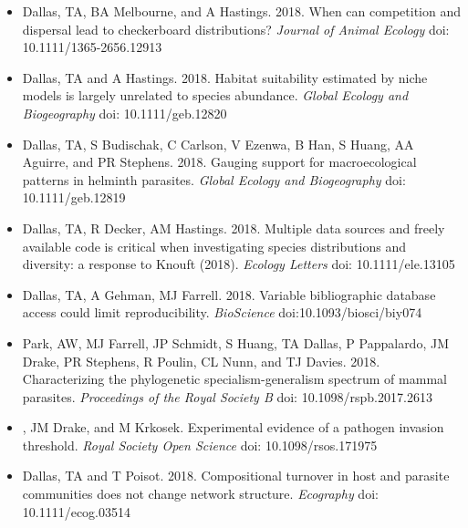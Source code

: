 \documentclass[]{CV}
\begin{document}
{}
\begin{itemize}

\item {\mefont Dallas, TA}, BA Melbourne, and A Hastings. 2018. When can competition and dispersal lead to checkerboard distributions? \textit{Journal of Animal Ecology} doi: 10.1111/1365-2656.12913

\item {\mefont Dallas, TA} and A Hastings. 2018. Habitat suitability estimated by niche models is largely unrelated to species abundance. \textit{Global Ecology and Biogeography} doi: 10.1111/geb.12820

\item {\mefont Dallas, TA}, S Budischak, C Carlson, V Ezenwa, B Han, S Huang, AA Aguirre, and PR Stephens. 2018. Gauging support for macroecological patterns in helminth parasites. \textit{Global Ecology and Biogeography} doi: 10.1111/geb.12819

\item {\mefont Dallas, TA}, R Decker, AM Hastings. 2018. Multiple data sources and freely available code is critical when investigating species distributions and diversity: a response to Knouft (2018). \textit{Ecology Letters} doi: 10.1111/ele.13105

\item {\mefont Dallas, TA}, A Gehman, MJ Farrell. 2018. Variable bibliographic database access could limit reproducibility. \textit{BioScience} doi:10.1093/biosci/biy074

\item Park, AW, MJ Farrell, JP Schmidt, S Huang, {\mefont TA Dallas}, P Pappalardo, JM Drake, PR Stephens, R Poulin, CL Nunn, and TJ Davies. 2018. Characterizing the phylogenetic specialism-generalism spectrum of mammal parasites. \textit{Proceedings of the Royal Society B} doi: 10.1098/rspb.2017.2613

\item {}, JM Drake, and M Krkosek. Experimental evidence of a pathogen invasion threshold. \textit{Royal Society Open Science} doi: 10.1098/rsos.171975

\item {\mefont Dallas, TA} and T Poisot. 2018. Compositional turnover in host and parasite communities does not change network structure. \textit{Ecography} doi: 10.1111/ecog.03514

\end{itemize}
\end{document}
